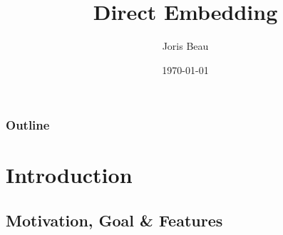 \documentclass{beamer}
\title[Direct Embedding]{Direct Embedding} %
\author{Joris Beau} %
\institute[EPFL] %
{
EPFL - LAMP \\ %
Project in computer science\\


Directed by \textbf{Martin Odersky}, Supervised by \textbf{Vojin Jovanovic}\\
\subject{Computer Science}
\medskip
}
\date{\today} %
\begin{document}
\begin{frame}
\titlepage %
\end{frame}

\begin{frame}
\frametitle{Outline} %
\tableofcontents %
\end{frame}


\section{Introduction} %

\subsection{Motivation, Goal \& Features } %

%
\end{document}
